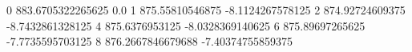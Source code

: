 0 883.6705322265625 0.0
1 875.55810546875 -8.1124267578125
2 874.92724609375 -8.7432861328125
4 875.6376953125 -8.0328369140625
6 875.89697265625 -7.7735595703125
8 876.2667846679688 -7.40374755859375

